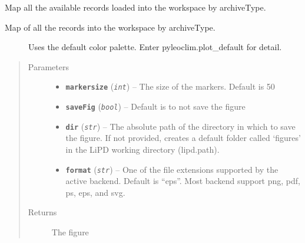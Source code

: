 \documentclass[letterpaper,10pt,english]{sphinxmanual}
\begin{document}
\begin{fulllineitems}
\label{Main:pyleoclim.MapAll}
Map all the available records loaded into the workspace by archiveType.
\begin{description}
\item[{Map of all the records into the workspace by archiveType.}] \leavevmode
Uses the default color palette. Enter pyleoclim.plot\_default for detail.

\end{description}
\begin{quote}\begin{description}
\item[{Parameters}] \leavevmode\begin{itemize}
\item {} 
\textbf{\texttt{markersize}} (\emph{\texttt{int}}) -- The size of the markers. Default is 50

\item {} 
\textbf{\texttt{saveFig}} (\emph{\texttt{bool}}) -- Default is to not save the figure

\item {} 
\textbf{\texttt{dir}} (\emph{\texttt{str}}) -- The absolute path of the directory in which to save the
figure. If not provided, creates a default folder called `figures'
in the LiPD working directory (lipd.path).

\item {} 
\textbf{\texttt{format}} (\emph{\texttt{str}}) -- One of the file extensions supported by the active
backend. Default is ``eps''. Most backend support png, pdf, ps, eps,
and svg.

\end{itemize}

\item[{Returns}] \leavevmode
The figure

\end{description}\end{quote}

\end{fulllineitems}

\end{document}
